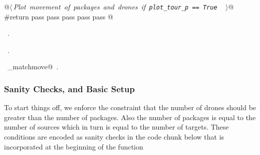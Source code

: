 \documentclass[10pt, english, oneside]{report}
\begin{document}
\begin{flushleft}
\begin{minipage}{\linewidth}
\begin{list}{}{}
\mbox{}\verb@     @\hbox{$\langle\,${\itshape Plot movement of packages and drones if \verb|plot_tour_p == True |}\nobreak\ {\footnotesize {}}$\,\rangle$}\verb@ @\\
\mbox{}\verb@     #return pass pass pass pass pass @\\
\mbox{}\verb@@{\NWsep}
\end{list}
\vspace{-1.5ex}
\footnotesize
\begin{list}{}{\setlength{\itemsep}{-\parsep}\setlength{\itemindent}{-\leftmargin}}
\item \NWtxtMacroDefBy\ .
\item \NWtxtMacroRefIn\ .
\item \NWtxtIdentsDefed\nobreak\  \verb@algo_matchmove@\nobreak\ .
\item{}
\end{list}
\end{minipage}\vspace{4ex}
\end{flushleft}

\subsubsection{Sanity Checks, and Basic Setup}
\label{ssec:sancheck}
To start things off, we enforce the constraint that the number of drones 
should be greater than the number of packages. Also the number of 
packages is equal to the number of sources which in turn is equal to the 
number of targets. These conditions are encoded as sanity checks 
in the code chunk below that is incorporated at the beginning of the 
function 
\end{document}
